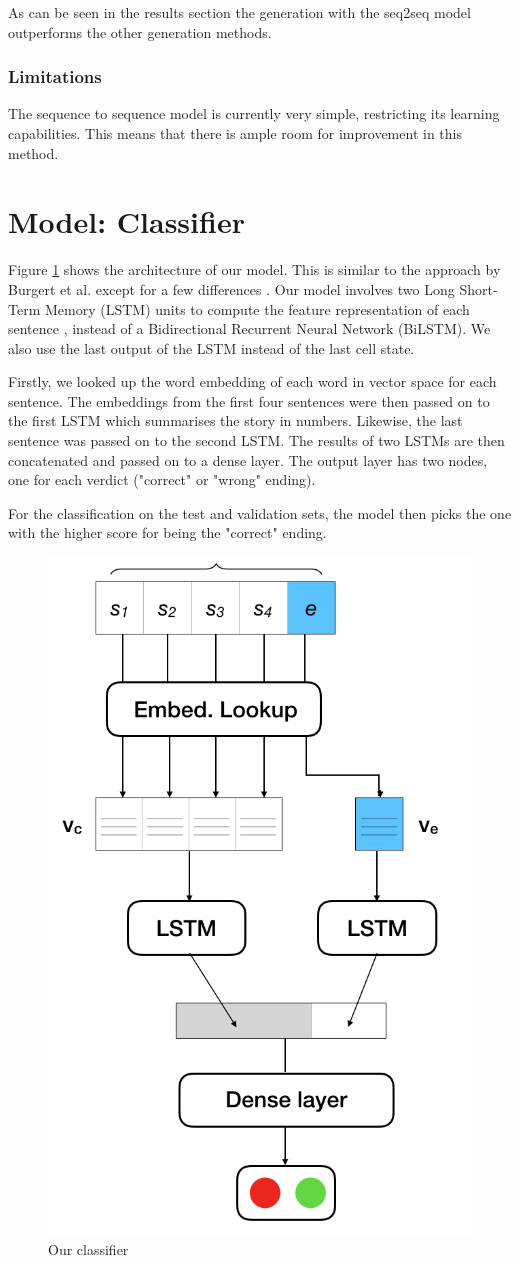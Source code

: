 \documentclass{article}
\begin{document}
As can be seen in the results section the generation with the seq2seq model outperforms the other generation methods.

\subsubsection{Limitations}
The sequence to sequence model is currently very simple, restricting its learning capabilities. This means that there is ample room for improvement in this method.

\section{Model: Classifier}

Figure \ref{Figure:model} shows the architecture of our model. This is similar to the approach by Burgert et al. except for a few differences \cite{top4}. Our model involves two Long Short-Term Memory (LSTM) units to compute the feature representation of each sentence \citep{lstm}, instead of a Bidirectional Recurrent Neural Network (BiLSTM). We also use the last output of the LSTM instead of the last cell state.

Firstly, we looked up the word embedding of each word in vector space for each sentence. The embeddings from the first four sentences were then passed on to the first LSTM which summarises the story in numbers. Likewise, the last sentence was passed on to the second LSTM. The results of two LSTMs are then concatenated and passed on to a dense layer. The output layer has two nodes, one for each verdict ("correct" or "wrong" ending).

For the classification on the test and validation sets, the model then picks the one with the higher score for being the "correct" ending.

\begin{figure}
  \centering
  \includegraphics[width=0.5 \linewidth]{fig/ourmodel.png}
  \caption{Our classifier}
  \label{Figure:model}
\end{figure}
\end{document}
